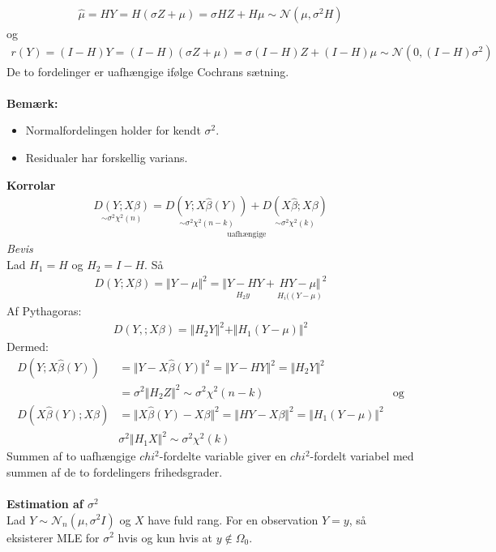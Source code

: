 \documentclass[12pt,a4paper]{report}
\begin{document}
\begin{align*}
\hat{\mu}=HY=H(\sigma Z+\mu)=\sigma HZ+H\mu\sim\mathcal{N}(\mu,\sigma^2H)
\end{align*}
og
\begin{align*}
r(Y)=(I-H)Y=(I-H)(\sigma Z+\mu)=\sigma(I-H)Z+(I-H)\mu\sim\mathcal{N}(0,(I-H)\sigma^2)
\end{align*}
De to fordelinger er uafhængige ifølge Cochrans sætning.\\\\
\textbf{Bemærk:}
\begin{itemize}
\item Normalfordelingen holder for kendt $\sigma^2$.
\item Residualer har forskellig varians.
\end{itemize}
\textbf{Korrolar}
\begin{align*}
\underset{\sim\sigma^2\chi^2(n)}{D(Y;X\beta)}=\underset{\text{uafhængige}}{\underset{\sim\sigma^2\chi^2(n-k)}{D(Y;X\hat{\beta}(Y))}+\underset{\sim\sigma^2\chi^2(k)}{D(X\hat{\beta};X\beta)}}
\end{align*}
\textit{Bevis}\\
Lad $H_1=H$ og $H_2=I-H$. Så
\begin{align*}
D(Y;X\beta)=\Vert Y-\mu\Vert^2=\underset{H_2y}{\Vert Y-HY}+\underset{H_i((Y-\mu)}{HY-\mu\Vert}^2
\end{align*}
Af Pythagoras:
\begin{align*}
D(Y,;X\beta)=\Vert H_2Y\Vert^2+\Vert H_1(Y-\mu)\Vert^2
\end{align*}
Dermed:
\begin{align*}
D(Y;X\hat{\beta}(Y))&=\Vert Y-X\hat{\beta}(Y)\Vert^2=\Vert Y-HY\Vert^2=\Vert H_2Y\Vert^2\\
&=\sigma^2\Vert H_2Z\Vert^2\sim\sigma^2\chi^2(n-k)& \text{og}\\
D(X\hat{\beta}(Y);X\beta)&=\Vert X\hat{\beta}(Y)-X\beta\Vert^2=\Vert HY-X\beta\Vert^2=\Vert H_1(Y-\mu)\Vert^2\\
&\sigma^2\Vert H_1X\Vert^2\sim\sigma^2\chi^2(k)
\end{align*}
Summen af to uafhængige $chi^2$-fordelte variable giver en $chi^2$-fordelt variabel med summen af de to fordelingers frihedsgrader.\\\\
\textbf{Estimation af $\sigma^2$}\\
Lad $Y\sim\mathcal{N}_n(\mu,\sigma^2I)$ og $X$ have fuld rang. For en observation $Y=y$, så eksisterer MLE for $\sigma^2$ hvis og kun hvis at $y\notin\Omega_0$.
\end{document}

